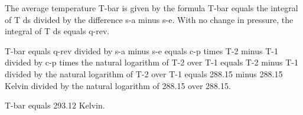 The average temperature T-bar is given by the formula T-bar equals the integral of T ds divided by the difference s-a minus s-e. With no change in pressure, the integral of T ds equals q-rev.

T-bar equals q-rev divided by s-a minus s-e equals c-p times T-2 minus T-1 divided by c-p times the natural logarithm of T-2 over T-1 equals T-2 minus T-1 divided by the natural logarithm of T-2 over T-1 equals 288.15 minus 288.15 Kelvin divided by the natural logarithm of 288.15 over 288.15.

T-bar equals 293.12 Kelvin.